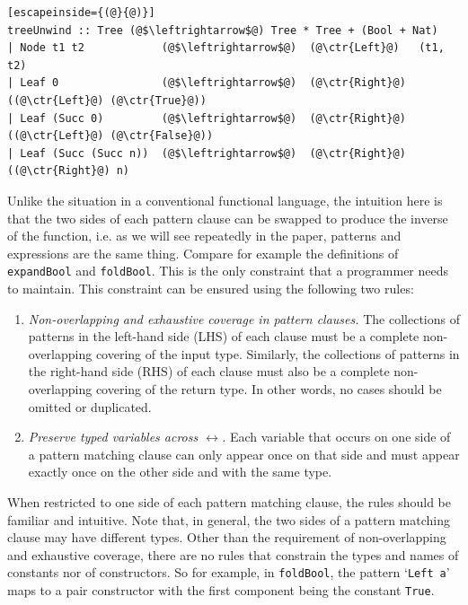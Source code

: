 \documentclass{article}
\newcommand{\ctr}[1]{{\scriptsize{\texttt{#1}}}}
\begin{document}
\vspace{-25pt}
\begin{lstlisting}[escapeinside={(@}{@)}]
treeUnwind :: Tree (@$\leftrightarrow$@) Tree * Tree + (Bool + Nat)
| Node t1 t2            (@$\leftrightarrow$@)  (@\ctr{Left}@)   (t1, t2)
| Leaf 0                (@$\leftrightarrow$@)  (@\ctr{Right}@)  ((@\ctr{Left}@) (@\ctr{True}@))
| Leaf (Succ 0)         (@$\leftrightarrow$@)  (@\ctr{Right}@)  ((@\ctr{Left}@) (@\ctr{False}@))
| Leaf (Succ (Succ n))  (@$\leftrightarrow$@)  (@\ctr{Right}@)  ((@\ctr{Right}@) n)
 \end{lstlisting}

Unlike the situation in a conventional functional language, the
intuition here is that the two sides of each pattern clause can be
swapped to produce the inverse of the function, i.e. as we will see
repeatedly in the paper, patterns and expressions are the same
thing. Compare for example the definitions of \ctr{expandBool} and
\ctr{foldBool}. This is the only constraint that a programmer needs to
maintain. This constraint can be ensured using the following two
rules:

\begin{enumerate}
\label{rules}
\item \emph{Non-overlapping and exhaustive coverage in pattern
  clauses.} The collections of patterns in the left-hand side (LHS) of
  each clause must be a complete non-overlapping covering of the input
  type. Similarly, the collections of patterns in the right-hand side
  (RHS) of each clause must also be a complete non-overlapping
  covering of the return type. In other words, no cases should be
  omitted or duplicated.
\item \emph{Preserve typed variables across \ensuremath{\leftrightarrow}.} Each variable that
  occurs on one side of a pattern matching clause can only appear once on
  that side and must appear exactly once on the other side and with the same
  type.
\end{enumerate}

When restricted to one side of each pattern matching clause, the rules
should be familiar and intuitive. Note that, in general, the two sides
of a pattern matching clause may have different types. Other than the
requirement of non-overlapping and exhaustive coverage, there are no
rules that constrain the types and names of constants nor of
constructors. So for example, in \ctr{foldBool}, the pattern
`\ctr{Left}~\ctr{a}' maps to a pair constructor with the first
component being the constant \ctr{True}.
\end{document}
